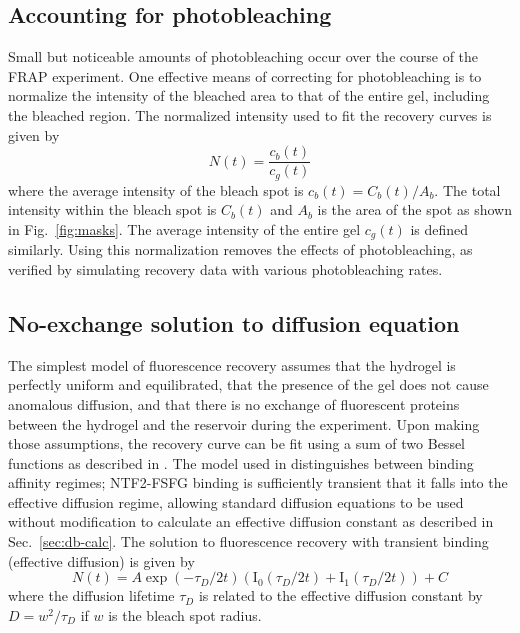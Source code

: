 \subsection{Accounting for photobleaching}
\label{sec:photobleaching}
Small but noticeable amounts of photobleaching occur over the course of the FRAP experiment.  One effective means of correcting for photobleaching is to normalize the intensity of the bleached area to that of the entire gel, including the bleached region.  The normalized intensity used to fit the recovery curves is given by
\begin{equation}
N(t) = \frac{c_b(t)}{c_g(t)}
\end{equation} where the average intensity of the bleach spot is $c_b(t) = C_b(t)/A_b$. The total intensity within the bleach spot is $C_b(t)$ and $A_b$ is the area of the spot as shown in Fig.~\ref{fig:masks}.  The average intensity of the entire gel $c_g(t)$ is defined similarly.  Using this normalization removes the effects of photobleaching, as verified by simulating recovery data with various photobleaching rates.

\subsection{No-exchange solution to diffusion equation}
\label{sec:no-exchange}

The simplest model of fluorescence recovery assumes that the hydrogel is perfectly uniform and equilibrated, that the presence of the gel does not cause anomalous diffusion, and that there is no exchange of fluorescent proteins between the hydrogel and the reservoir during the experiment.  Upon making those assumptions, the recovery curve can be fit using a sum of two Bessel functions as described in \cite{yang18,sprague04}.  The model used in \cite{sprague04} distinguishes between binding affinity regimes; NTF2-FSFG binding is sufficiently transient that it falls into the effective diffusion regime, allowing standard diffusion equations to be used without modification to calculate an effective diffusion constant as described in Sec.~\ref{sec:db-calc}.  The solution to fluorescence recovery with transient binding (effective diffusion) is given by
\begin{equation}
N(t) = A\exp(-\tau_D/2t)\left(\mathrm{I}_0(\tau_D/2t)+\mathrm{I}_1(\tau_D/2t)\right)+C
\end{equation} where the diffusion lifetime $\tau_D$ is related to the effective diffusion constant by $D = w^2/\tau_D$ if $w$ is the bleach spot radius.  

